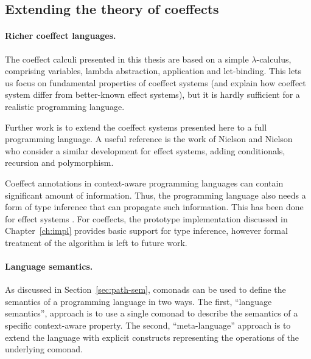 
\subsection{Extending the theory of coeffects }
\label{sec:further-theory}

\paragraph{Richer coeffect languages.}
The coeffect calculi presented in this thesis are based on a simple $\lambda$-calculus, comprising
variables, lambda abstraction, application and let-binding. This lets us focus on fundamental
properties of coeffect systems (and explain how coeffect system differ from better-known effect
systems), but it is hardly sufficient for a realistic programming language.

Further work is to extend the coeffect systems presented here to a full programming language. A
useful reference is the work of Nielson and Nielson~\cite{effects-nielson} who consider a
similar development for effect systems, adding conditionals, recursion and polymorphism.

Coeffect annotations in context-aware programming languages can contain significant amount
of information. Thus, the programming language also needs a form of type inference that can propagate
such information. This has been done for effect systems \cite{effects-polymorphic}. For coeffects,
the prototype implementation discussed in Chapter~\ref{ch:impl} provides basic support for
type inference, however formal treatment of the algorithm is left to future work.


\paragraph{Language semantics.}

As discussed in Section~\ref{sec:path-sem}, comonads can be used to define the semantics of a
programming language in two ways. The first, ``language semantics'', approach is to use a
single comonad to describe the semantics of a specific context-aware property. The second,
``meta-language'' approach is to extend the language with explicit constructs representing the
operations of the underlying comonad.

